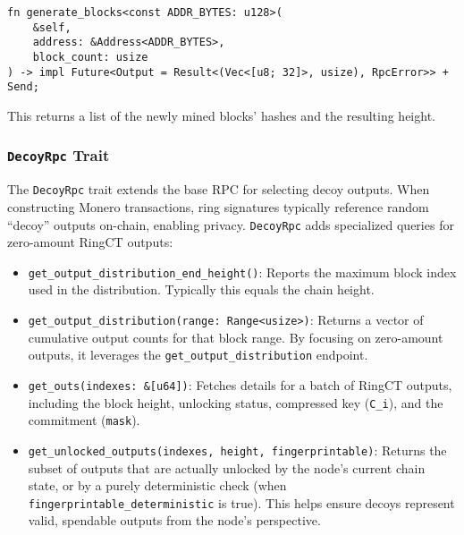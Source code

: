 \begin{verbatim}
fn generate_blocks<const ADDR_BYTES: u128>(
    &self,
    address: &Address<ADDR_BYTES>,
    block_count: usize
) -> impl Future<Output = Result<(Vec<[u8; 32]>, usize), RpcError>> + Send;
\end{verbatim}

This returns a list of the newly mined blocks’ hashes and the resulting height.

\subsubsection{\texttt{DecoyRpc} Trait}
\label{sec:monero-rpc-decoy-rpc}

The \texttt{DecoyRpc} trait extends the base RPC for selecting decoy outputs.  
When constructing Monero transactions, ring signatures typically reference
random “decoy” outputs on-chain, enabling privacy.  \texttt{DecoyRpc} adds
specialized queries for zero-amount RingCT outputs:

\begin{itemize}
    \item \texttt{get\_output\_distribution\_end\_height()}: Reports the maximum
    block index used in the distribution.  Typically this equals the chain
    height. %
    \item \texttt{get\_output\_distribution(range: Range<usize>)}: Returns a
    vector of cumulative output counts for that block range.  By focusing on
    zero-amount outputs, it leverages the \texttt{get\_output\_distribution}
    endpoint. %
    \item \texttt{get\_outs(indexes: \&[u64])}: Fetches details for a batch of
    RingCT outputs, including the block height, unlocking status, compressed key
    (\texttt{C\_i}), and the commitment (\texttt{mask}). %
    \item \texttt{get\_unlocked\_outputs(indexes, height, fingerprintable)}:
    Returns the subset of outputs that are actually unlocked by the node’s
    current chain state, or by a purely deterministic check (when
    \texttt{fingerprintable\_deterministic} is true).  This helps ensure
    decoys represent valid, spendable outputs from the node’s perspective. %
\end{itemize}

